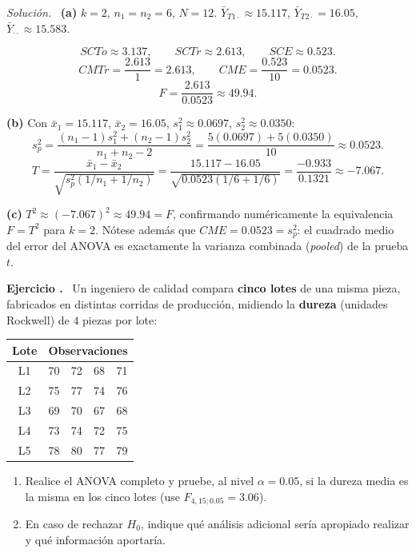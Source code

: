 \documentclass[11pt,a4paper]{article}
\newcounter{ejnum}
\newenvironment{ejercicio}{\refstepcounter{ejnum}\par\medskip\noindent\textbf{Ejercicio \theejnum.}~}{\par}
\newenvironment{solucion}{\par\noindent\textit{Solución.}~}{\par\vspace{1em}}
\begin{document}
\begin{solucion}
\textbf{(a)} $k=2$, $n_1=n_2=6$, $N=12$. $\bar Y_{T1\cdot}\approx15.117$, $\bar Y_{T2\cdot}=16.05$, $\bar Y_{\cdot\cdot}\approx15.583$.

\[
SCTo\approx3.137, \qquad SCTr\approx2.613, \qquad SCE\approx0.523.
\]
\[
CMTr=\frac{2.613}{1}=2.613, \qquad CME=\frac{0.523}{10}=0.0523.
\]
\[
F=\frac{2.613}{0.0523}\approx49.94.
\]

\textbf{(b)} Con $\bar x_1=15.117$, $\bar x_2=16.05$, $s_1^2\approx0.0697$, $s_2^2\approx0.0350$:
\[
s_p^2=\frac{(n_1-1)s_1^2+(n_2-1)s_2^2}{n_1+n_2-2}=\frac{5(0.0697)+5(0.0350)}{10}\approx0.0523.
\]
\[
T=\frac{\bar x_1-\bar x_2}{\sqrt{s_p^2(1/n_1+1/n_2)}}=\frac{15.117-16.05}{\sqrt{0.0523(1/6+1/6)}}=\frac{-0.933}{0.1321}\approx-7.067.
\]

\textbf{(c)} $T^2\approx(-7.067)^2\approx49.94 = F$, confirmando numéricamente la equivalencia $F=T^2$ para $k=2$. Nótese además que $CME=0.0523=s_p^2$: el cuadrado medio del error del ANOVA es exactamente la varianza combinada (\emph{pooled}) de la prueba $t$.
\end{solucion}

\begin{ejercicio}
Un ingeniero de calidad compara \textbf{cinco lotes} de una misma pieza, fabricados en distintas corridas de producción, midiendo la \textbf{dureza} (unidades Rockwell) de $4$ piezas por lote:

\begin{table}[htbp]
\centering
\begin{tabular}{c|cccc}
\toprule
Lote & \multicolumn{4}{c}{Observaciones} \\
\midrule
L1 & 70 & 72 & 68 & 71 \\
L2 & 75 & 77 & 74 & 76 \\
L3 & 69 & 70 & 67 & 68 \\
L4 & 73 & 74 & 72 & 75 \\
L5 & 78 & 80 & 77 & 79 \\
\bottomrule
\end{tabular}
\end{table}

\begin{enumerate}[label=(\alph*)]
\item Realice el ANOVA completo y pruebe, al nivel $\alpha=0.05$, si la dureza media es la misma en los cinco lotes (use $F_{4,15;0.05}=3.06$).
\item En caso de rechazar $H_0$, indique qué análisis adicional sería apropiado realizar y qué información aportaría.
\end{enumerate}
\end{ejercicio}
\end{document}
